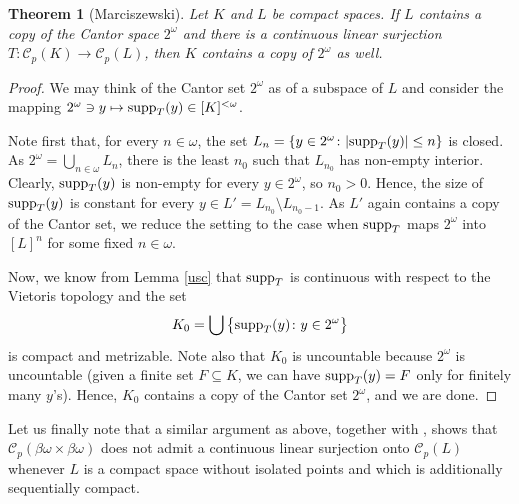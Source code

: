 \documentclass[12pt,fleqn]{amsart}
\numberwithin{equation}{section}
\newtheorem{thm}{Theorem}[section]
\theoremstyle{definition}
\def\C{\mathcal C}
\newcommand{\bobo}{\beta\omega\times\beta\omega}
\newcommand{\sub}{\subseteq}
\begin{document}
\begin{thm}[Marciszewski] \label{marciszewski}
Let $K$ and $L$ be compact spaces. If $L$ contains a copy of the Cantor space $2^\omega$ and there is a continuous linear
surjection $T\colon\C_p(K)\to \C_p(L)$, then $K$ contains a copy of $2^\omega$ as well.
\end{thm}


\begin{proof}
We may think of the Cantor set $2^\omega$ as of a subspace of $L$ and consider the
mapping $2^\omega\ni y\mapsto \protect{\rm supp}_T(y)\in [K]^{<\omega}$.

Note first that, for every $n\in\omega$, the set $L_n=\{y\in 2^\omega\colon |\protect{\rm supp}_T(y)|\le n\}$ is closed. 
As $2^\omega=\bigcup_{n\in\omega} L_n$, there is the least $n_0$ such that $L_{n_0}$ has non-empty interior.
Clearly, $\protect{\rm supp}_T(y)$ is non-empty for every $y\in 2^\omega$, so $n_0>0$. Hence,
the size of $\protect{\rm supp}_T(y)$ is constant for every $y\in L'=L_{n_0}\setminus L_{n_0-1}$.
As $L'$ again contains a copy of the Cantor set, we reduce the setting to the case when
$\protect{\rm supp}_T$ maps $2^\omega$ into $[L]^n$ for some fixed $n\in\omega$.

Now, we know from Lemma \ref{usc}  that $\protect{\rm supp}_T$ is continuous with respect to the Vietoris topology and
 the set
\[ K_0=\bigcup\big\{\protect{\rm supp}_T(y)\colon y\in 2^\omega\big\} \]
is compact and metrizable. Note also that $K_0$ is uncountable because
$2^\omega$ is uncountable (given a finite set $F\sub K$, we can have $\protect{\rm supp}_T(y)=F$ only for finitely many $y$'s).
Hence, $K_0$ contains a copy of the Cantor set $2^\omega$, and we are done.
\end{proof}

Let us finally note that a similar argument as above, together with \cite[Lemma 3.2]{Pl14}, shows
that $\C_p(\bobo)$ does not admit a continuous linear surjection onto $\C_p(L)$ whenever
$L$ is a  compact space without isolated points and which is additionally sequentially compact.
%
\end{document}
